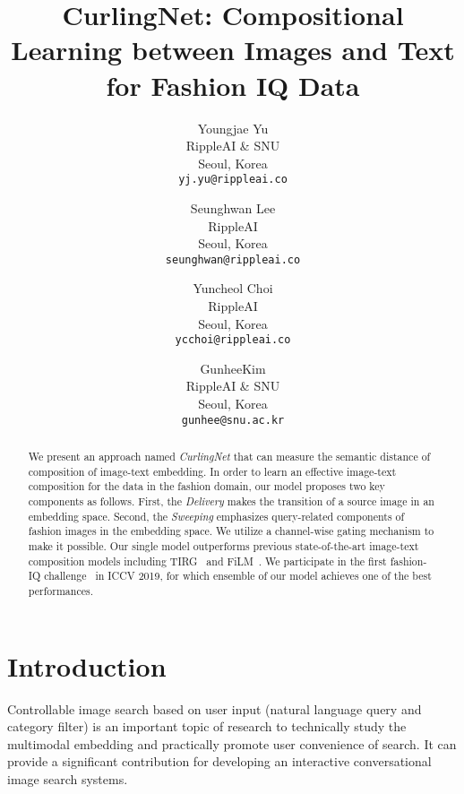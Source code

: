 \documentclass[10pt,twocolumn,letterpaper]{article}
\begin{document}
\title{CurlingNet: Compositional Learning between Images and Text for Fashion IQ Data}

\author{Youngjae Yu\\
RippleAI \& SNU\\
Seoul, Korea \\
{\tt\small yj.yu@rippleai.co}
\and
Seunghwan Lee\\
RippleAI\\
Seoul, Korea\\
{\tt\small seunghwan@rippleai.co}
\and
Yuncheol Choi\\
RippleAI \\
Seoul, Korea\\
{\tt\small ycchoi@rippleai.co}
\and
GunheeKim\\
RippleAI \& SNU \\
Seoul, Korea\\
{\tt\small gunhee@snu.ac.kr}
}

\maketitle
\ificcvfinal\thispagestyle{empty}\fi

\begin{abstract}
We present an approach named \textit{CurlingNet} that can measure the semantic distance of composition of image-text embedding. In order to learn an effective image-text composition for the data in the fashion domain, our model proposes two key components as follows.
First, the \textit{Delivery} makes the transition of a source image in an embedding space. 
Second, the \textit{Sweeping} emphasizes query-related components of fashion images in the embedding space.
We utilize a channel-wise gating mechanism to make it possible.
Our single model outperforms previous state-of-the-art image-text composition models including TIRG~\cite{vo-cvpr-2019} and FiLM~\cite{perez-AAAI-2018}. 
We participate in the first fashion-IQ challenge~\cite{fashioniq-arxiv-2019} in ICCV 2019, for which ensemble of our model achieves one of the best performances. 

\end{abstract}

\section{Introduction}

Controllable image search based on user input (\eg natural language query and category filter) is an important topic of research to technically study the multimodal embedding and practically promote user convenience of search.
It can provide a significant contribution for developing an interactive conversational image search systems.
\end{document}

